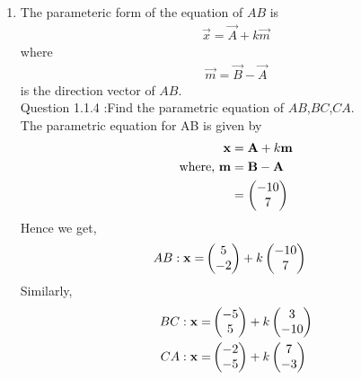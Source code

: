 \documentclass[11pt]{book}
\begin{document}
\begin{enumerate}[label=\thesection.\arabic*.,ref=\thesection.\theenumi]
From Fig. \ref{fig1:Triangle}, We can see that $\vec{A},\vec{B},\vec{C}$ are not collinear .
\begin{figure}[h]
\centering
\texttt{[image: /sdcard/Documents/fwc/moudle2/figs/ABCtriangle.png]}
\caption{$\vec{A},\vec{B},\vec{C}$ plot}
\label{fig1:Triangle}
\end{figure}



\item The parameteric form of the equation  of $AB$ is 
		\begin{align}
			\vec{x}=\vec{A}+k\vec{m}
		\end{align}
		where
		\begin{align}
\vec{m}=\vec{B}-\vec{A}
		\end{align}
is the direction vector of $AB$.\\
Question 1.1.4 :Find the parametric equation of $AB$,$BC$,$CA$.\\
\solution
The parametric equation for AB is given by
\begin{align}
\mathbf{x} &= \mathbf{A} + k\mathbf{m}\\
\text{where, } \mathbf{m} &= \mathbf{B} -\mathbf{A}\\
&= \begin{pmatrix}-10 \\7\end{pmatrix}
\end{align}
Hence we get,
\begin{align}
AB: \mathbf{x} = &\begin{pmatrix}5\\-2\end{pmatrix} + k \begin{pmatrix}-10\\7\end{pmatrix}
\end{align}
Similarly, 
\begin{align}
BC: \mathbf{x} = &\begin{pmatrix}-5\\5\end{pmatrix} + k \begin{pmatrix}3\\-10\end{pmatrix}\\
CA: \mathbf{x} = &\begin{pmatrix}-2\\-5\end{pmatrix} + k \begin{pmatrix}7\\-3\end{pmatrix}
\end{align}



\end{enumerate}
\end{document}
